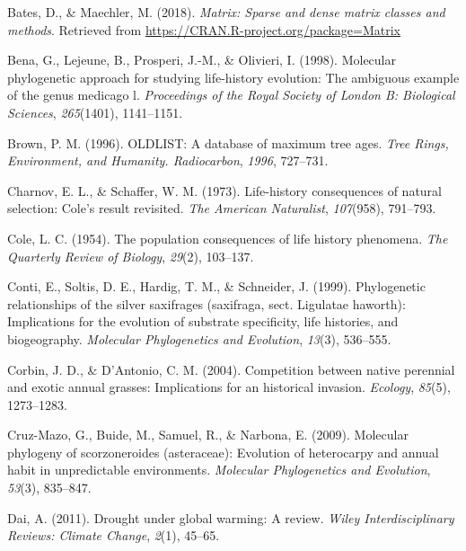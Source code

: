 \documentclass[man,floatsintext]{apa6}
\theoremstyle{definition}
\theoremstyle{definition}
\theoremstyle{definition}
\theoremstyle{remark}
\begin{document}
\leavevmode\hypertarget{ref-R-Matrix}{}%
Bates, D., \& Maechler, M. (2018). \emph{Matrix: Sparse and dense matrix
classes and methods}. Retrieved from
\url{https://CRAN.R-project.org/package=Matrix}

\leavevmode\hypertarget{ref-bena1998molecular}{}%
Bena, G., Lejeune, B., Prosperi, J.-M., \& Olivieri, I. (1998).
Molecular phylogenetic approach for studying life-history evolution: The
ambiguous example of the genus medicago l. \emph{Proceedings of the
Royal Society of London B: Biological Sciences}, \emph{265}(1401),
1141--1151.

\leavevmode\hypertarget{ref-brown1996oldlist}{}%
Brown, P. M. (1996). OLDLIST: A database of maximum tree ages.
\emph{Tree Rings, Environment, and Humanity. Radiocarbon}, \emph{1996},
727--731.

\leavevmode\hypertarget{ref-charnov1973life}{}%
Charnov, E. L., \& Schaffer, W. M. (1973). Life-history consequences of
natural selection: Cole's result revisited. \emph{The American
Naturalist}, \emph{107}(958), 791--793.

\leavevmode\hypertarget{ref-cole1954population}{}%
Cole, L. C. (1954). The population consequences of life history
phenomena. \emph{The Quarterly Review of Biology}, \emph{29}(2),
103--137.

\leavevmode\hypertarget{ref-conti1999phylogenetic}{}%
Conti, E., Soltis, D. E., Hardig, T. M., \& Schneider, J. (1999).
Phylogenetic relationships of the silver saxifrages (saxifraga, sect.
Ligulatae haworth): Implications for the evolution of substrate
specificity, life histories, and biogeography. \emph{Molecular
Phylogenetics and Evolution}, \emph{13}(3), 536--555.

\leavevmode\hypertarget{ref-corbin2004competition}{}%
Corbin, J. D., \& D'Antonio, C. M. (2004). Competition between native
perennial and exotic annual grasses: Implications for an historical
invasion. \emph{Ecology}, \emph{85}(5), 1273--1283.

\leavevmode\hypertarget{ref-cruz2009molecular}{}%
Cruz-Mazo, G., Buide, M., Samuel, R., \& Narbona, E. (2009). Molecular
phylogeny of scorzoneroides (asteraceae): Evolution of heterocarpy and
annual habit in unpredictable environments. \emph{Molecular
Phylogenetics and Evolution}, \emph{53}(3), 835--847.

\leavevmode\hypertarget{ref-dai2011drought}{}%
Dai, A. (2011). Drought under global warming: A review. \emph{Wiley
Interdisciplinary Reviews: Climate Change}, \emph{2}(1), 45--65.
\end{document}
